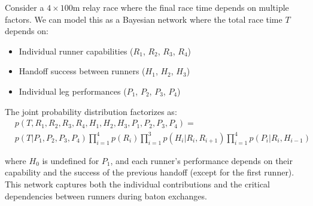 \documentclass{article}
\begin{document}
  \begin{example}
    Consider a $4\times100$m relay race where the final race time depends on multiple factors. We can model this as a Bayesian network where the total race time $T$ depends on:
    \begin{itemize}
      \item Individual runner capabilities ($R_1$, $R_2$, $R_3$, $R_4$)
      \item Handoff success between runners ($H_1$, $H_2$, $H_3$)
      \item Individual leg performances ($P_1$, $P_2$, $P_3$, $P_4$)
    \end{itemize}

    The joint probability distribution factorizes as:
    \begin{align*}
      & p(T, R_1, R_2, R_3, R_4, H_1, H_2, H_3, P_1, P_2, P_3, P_4) = \\
      & p(T|P_1,P_2,P_3,P_4) \prod_{i=1}^4 p(R_i) \prod_{i=1}^3 p(H_i|R_i,R_{i+1}) \prod_{i=1}^4 p(P_i|R_i,H_{i-1})
    \end{align*}

    \noindent where $H_0$ is undefined for $P_1$, and each runner's performance depends on their capability and the success of the previous handoff (except for the first runner). This network captures both the individual contributions and the critical dependencies between runners during baton exchanges.

    \begin{figure}[H]
      \centering 
\end{figure}
\end{example}
\end{document}
